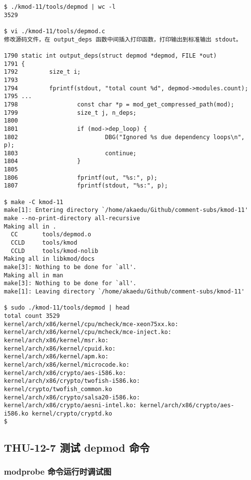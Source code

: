 \documentclass[11pt,a4paper]{article}
\begin{document}
{\begin{shaded}\begin{verbatim}
$ ./kmod-11/tools/depmod | wc -l
3529

$ vi ./kmod-11/tools/depmod.c
修改源码文件，在 output_deps 函数中间插入打印函数，打印输出到标准输出 stdout。

1790 static int output_deps(struct depmod *depmod, FILE *out)
1791 {
1792         size_t i;
1793 
1794         fprintf(stdout, "total count %d", depmod->modules.count);
1795 ...
1798                 const char *p = mod_get_compressed_path(mod);
1799                 size_t j, n_deps;
1800 
1801                 if (mod->dep_loop) {
1802                         DBG("Ignored %s due dependency loops\n", p);
1803                         continue;
1804                 }
1805 
1806                 fprintf(out, "%s:", p);
1807                 fprintf(stdout, "%s:", p);

$ make -C kmod-11
make[1]: Entering directory `/home/akaedu/Github/comment-subs/kmod-11'
make --no-print-directory all-recursive
Making all in .
  CC       tools/depmod.o
  CCLD     tools/kmod
  CCLD     tools/kmod-nolib
Making all in libkmod/docs
make[3]: Nothing to be done for `all'.
Making all in man
make[3]: Nothing to be done for `all'.
make[1]: Leaving directory `/home/akaedu/Github/comment-subs/kmod-11'

$ sudo ./kmod-11/tools/depmod | head
total count 3529
kernel/arch/x86/kernel/cpu/mcheck/mce-xeon75xx.ko:
kernel/arch/x86/kernel/cpu/mcheck/mce-inject.ko:
kernel/arch/x86/kernel/msr.ko:
kernel/arch/x86/kernel/cpuid.ko:
kernel/arch/x86/kernel/apm.ko:
kernel/arch/x86/kernel/microcode.ko:
kernel/arch/x86/crypto/aes-i586.ko:
kernel/arch/x86/crypto/twofish-i586.ko: kernel/crypto/twofish_common.ko
kernel/arch/x86/crypto/salsa20-i586.ko:
kernel/arch/x86/crypto/aesni-intel.ko: kernel/arch/x86/crypto/aes-i586.ko kernel/crypto/cryptd.ko
$ 
\end{verbatim}\end{shaded}}
\subsection{THU-12-7 测试 depmod 命令}

\subsubsection{modprobe 命令运行时调试图}
\end{document}
